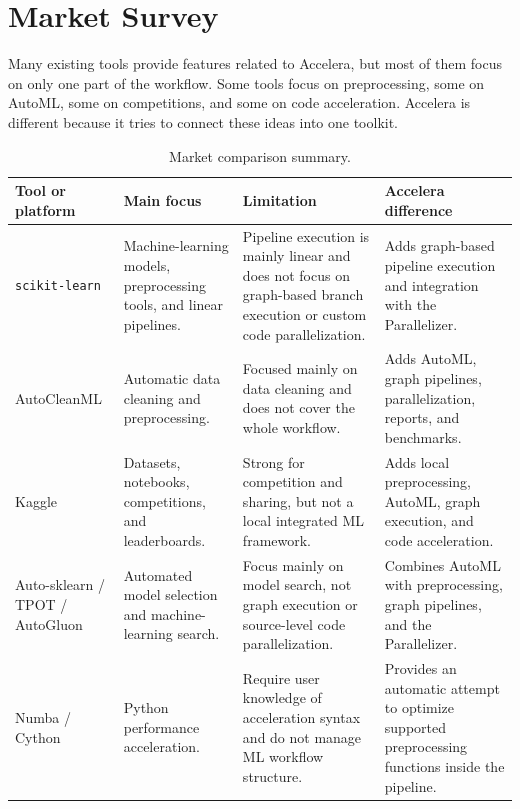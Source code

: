 \documentclass[12pt,a4paper]{report}
\begin{document}
\section{Market Survey}

Many existing tools provide features related to Accelera, but most of them focus
on only one part of the workflow. Some tools focus on preprocessing, some on
AutoML, some on competitions, and some on code acceleration. Accelera is
different because it tries to connect these ideas into one toolkit.

\begin{table}[!htbp]
\centering
\caption{Market comparison summary.}
\label{tab:market-comparison}
\small
\renewcommand{\arraystretch}{1.18}
\setlength{\tabcolsep}{4pt}
\begin{tabular}{p{}p{}p{}p{}}
\toprule
Tool or platform & Main focus & Limitation & Accelera difference \\
\midrule
\texttt{scikit-learn} &
Machine-learning models, preprocessing tools, and linear pipelines. &
Pipeline execution is mainly linear and does not focus on graph-based branch
execution or custom code parallelization. &
Adds graph-based pipeline execution and integration with the Parallelizer. \\

AutoCleanML &
Automatic data cleaning and preprocessing. &
Focused mainly on data cleaning and does not cover the whole workflow. &
Adds AutoML, graph pipelines, parallelization, reports, and benchmarks. \\

Kaggle &
Datasets, notebooks, competitions, and leaderboards. &
Strong for competition and sharing, but not a local integrated ML framework. &
Adds local preprocessing, AutoML, graph execution, and code acceleration. \\

Auto-sklearn / TPOT / AutoGluon &
Automated model selection and machine-learning search. &
Focus mainly on model search, not graph execution or source-level code
parallelization. &
Combines AutoML with preprocessing, graph pipelines, and the Parallelizer. \\

Numba / Cython &
Python performance acceleration. &
Require user knowledge of acceleration syntax and do not manage ML workflow
structure. &
Provides an automatic attempt to optimize supported preprocessing functions
inside the pipeline. \\
\bottomrule
\end{tabular}
\renewcommand{\arraystretch}{1.0}
\end{table}
\end{document}
